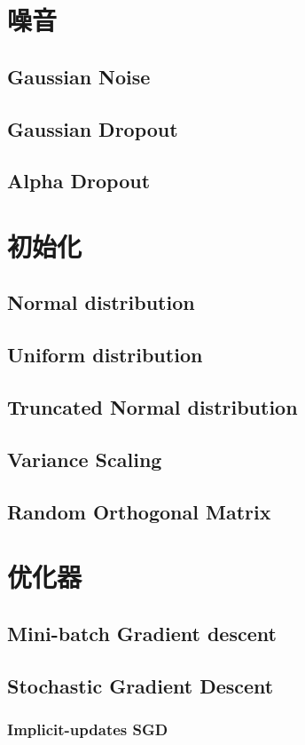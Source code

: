 \documentclass[oneside]{book}
\begin{document}
	\chapter{噪音}
		\section{Gaussian Noise}
		\section{Gaussian Dropout}
		\section{Alpha Dropout}

	\chapter{初始化}
		\section{Normal distribution}
		\section{Uniform distribution}
		\section{Truncated Normal distribution}
		\section{Variance Scaling}
		\section{Random Orthogonal Matrix}

	\chapter{优化器}
		\section{Mini-batch	Gradient descent}
		\section{Stochastic Gradient Descent}
			\subsection{Implicit-updates SGD}
\end{document}
